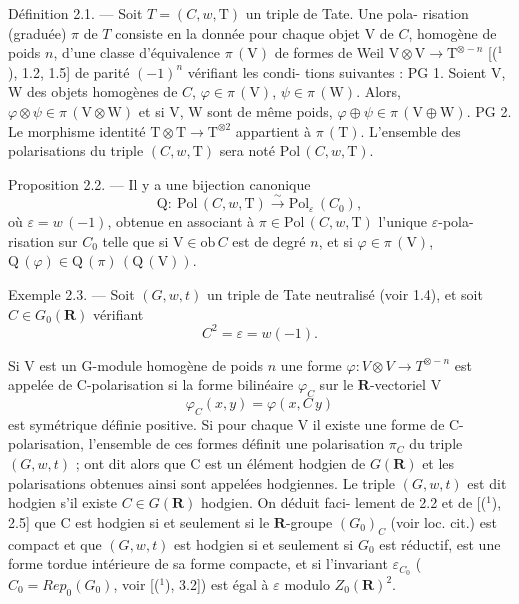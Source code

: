 \documentclass[11pt]{article}
\newcommand{\scanpage}[1]{\par\bigskip\noindent{\small\sffamily[scan #1]}\par}
\newcommand{\mspage}[1]{{\small\sffamily[p.\,#1]}}
\newcommand{\hand}[1]{\textcolor{blue}{#1}}
\begin{document}
Définition 2.1. --- Soit $T = (C, w, \mathrm{T})$ un triple de Tate. Une pola-%
risation (graduée) $\pi$ de $T$ consiste en la donnée pour chaque objet V
de $C$, homogène de poids $n$, d'une classe d'équivalence $\pi\,(\mathrm{V})$ de formes
de Weil $\mathrm{V} \otimes \mathrm{V} \to \mathrm{T}^{\otimes -n}$ [(${}^1$), 1.2, 1.5] de parité $(-1)^n$ vérifiant les condi-%
tions suivantes :
PG 1. Soient V, W des objets homogènes de $C$, $\varphi \in \pi\,(\mathrm{V})$, $\psi \in \pi\,(\mathrm{W})$. Alors,
$\varphi \otimes \psi \in \pi\,(\mathrm{V} \otimes \mathrm{W})$ et si V, W sont de même poids, $\varphi \oplus \psi \in \pi\,(\mathrm{V} \oplus \mathrm{W})$.
PG 2. Le morphisme identité $\mathrm{T} \otimes \mathrm{T} \to \mathrm{T}^{\otimes 2}$ appartient à $\pi\,(\mathrm{T})$.
L'ensemble des polarisations du triple $(C, w, \mathrm{T})$ sera noté $\mathrm{Pol}\,(C, w, \mathrm{T})$.

Proposition 2.2. --- Il y a une bijection canonique
\[ \mathrm{Q} : \ \mathrm{Pol}\,(C, w, \mathrm{T}) \xrightarrow{\sim} \mathrm{Pol}_\varepsilon\,(C_0), \]
où $\varepsilon = w\,(-1)$, obtenue en associant à $\pi \in \mathrm{Pol}\,(C, w, \mathrm{T})$ l'unique $\varepsilon$-pola-%
risation sur $C_0$ telle que si $\mathrm{V} \in \mathrm{ob}\,C$ est de degré $n$, et si $\varphi \in \pi\,(\mathrm{V})$,
$\mathrm{Q}\,(\varphi) \in \mathrm{Q}\,(\pi)\,(\mathrm{Q}\,(\mathrm{V}))$.

\mspage{\hand{66}}

\clearpage
\scanpage{119/67}
\mspage{( 3 )}

Exemple 2.3. --- Soit $(G, w, t)$ un triple de Tate neutralisé (voir 1.4),
et soit $C \in G_0(\mathbf{R})$ vérifiant
\[ C^2 = \varepsilon = w(-1). \]

Si V est un G-module homogène de poids $n$ une forme $\varphi : V \otimes V \to T^{\otimes -n}$
est appelée de C-polarisation si la forme bilinéaire $\varphi_C$ sur le $\mathbf{R}$-vectoriel V
\[ \varphi_C(x, y) = \varphi(x, C\,y) \]
est symétrique définie positive. Si pour chaque V il existe une forme
de C-polarisation, l'ensemble de ces formes définit une polarisation $\pi_C$
du triple $(G, w, t)$ ; ont dit alors que C est un élément hodgien de $G(\mathbf{R})$
et les polarisations obtenues ainsi sont appelées hodgiennes. Le triple
$(G, w, t)$ est dit hodgien s'il existe $C \in G(\mathbf{R})$ hodgien. On déduit faci-%
lement de 2.2 et de [(${}^1$), 2.5] que C est hodgien si et seulement si le
$\mathbf{R}$-groupe $(G_0)_C$ (voir loc. cit.) est compact et que $(G, w, t)$ est hodgien
si et seulement si $G_0$ est réductif, est une forme tordue intérieure de sa
forme compacte, et si l'invariant $\varepsilon_{C_0}$ ($C_0 = Rep_0(G_0)$, voir [(${}^1$), 3.2])
est égal à $\varepsilon$ modulo $Z_0(\mathbf{R})^2$.
\end{document}
